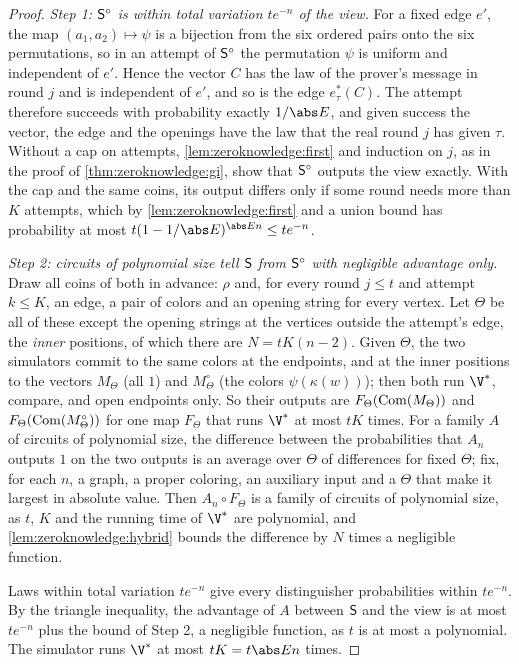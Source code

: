 \begin{refsection}
\begin{proof}
\emph{Step 1: $\mathsf{S}^\circ$ is within total variation $te^{-n}$ of the view.} For a fixed edge $e'$, the map $(a_1,a_2)\mapsto\psi$ is a bijection from the six ordered pairs onto the six permutations, so in an attempt of $\mathsf{S}^\circ$ the permutation $\psi$ is uniform and independent of $e'$. Hence the vector $C$ has the law of the prover's message in round $j$ and is independent of $e'$, and so is the edge $e^*_\tau(C)$. The attempt therefore succeeds with probability exactly $1/\abs E$, and given success the vector, the edge and the openings have the law that the real round $j$ has given $\tau$. Without a cap on attempts, \cref{lem:zeroknowledge:first} and induction on $j$, as in the proof of \cref{thm:zeroknowledge:gi}, show that $\mathsf{S}^\circ$ outputs the view exactly. With the cap and the same coins, its output differs only if some round needs more than $K$ attempts, which by \cref{lem:zeroknowledge:first} and a union bound has probability at most $t(1-1/\abs E)^{\abs En}\le te^{-n}$.

\emph{Step 2: circuits of polynomial size tell $\mathsf{S}$ from $\mathsf{S}^\circ$ with negligible advantage only.} Draw all coins of both in advance: $\rho$ and, for every round $j\le t$ and attempt $k\le K$, an edge, a pair of colors and an opening string for every vertex. Let $\Theta$ be all of these except the opening strings at the vertices outside the attempt's edge, the \emph{inner} positions, of which there are $N=tK(n-2)$. Given $\Theta$, the two simulators commit to the same colors at the endpoints, and at the inner positions to the vectors $M_\Theta$ (all $1$) and $M^\circ_\Theta$ (the colors $\psi(\kappa(w))$); then both run $\V^*$, compare, and open endpoints only. So their outputs are $F_\Theta(\mathrm{Com}(M_\Theta))$ and $F_\Theta(\mathrm{Com}(M^\circ_\Theta))$ for one map $F_\Theta$ that runs $\V^*$ at most $tK$ times. For a family $A$ of circuits of polynomial size, the difference between the probabilities that $A_n$ outputs $1$ on the two outputs is an average over $\Theta$ of differences for fixed $\Theta$; fix, for each $n$, a graph, a proper coloring, an auxiliary input and a $\Theta$ that make it largest in absolute value. Then $A_n\circ F_\Theta$ is a family of circuits of polynomial size, as $t$, $K$ and the running time of $\V^*$ are polynomial, and \cref{lem:zeroknowledge:hybrid} bounds the difference by $N$ times a negligible function.

Laws within total variation $te^{-n}$ give every distinguisher probabilities within $te^{-n}$. By the triangle inequality, the advantage of $A$ between $\mathsf{S}$ and the view is at most $te^{-n}$ plus the bound of Step 2, a negligible function, as $t$ is at most a polynomial. The simulator runs $\V^*$ at most $tK=t\abs En$ times.
\end{proof}


\end{refsection}
